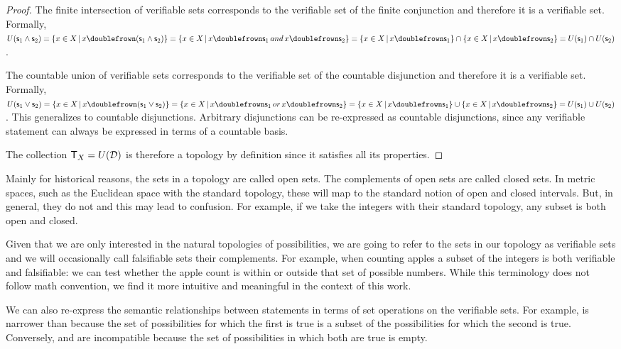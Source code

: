 \documentclass[11pt,letterpaper,fleqn]{memoir} %
\begin{document}
\begin{mathSection}
\begin{proof}
	The finite intersection of verifiable sets corresponds to the verifiable set of the finite conjunction and therefore it is a verifiable set. Formally, $U(\stmt_1\AND\stmt_2) = \{ x \in X \, | \, x \comp (\stmt_1\AND\stmt_2)\} =  \{ x \in X \, | \, x \comp \stmt_1 \, and \, x \comp \stmt_2\} = \{ x \in X \, | \, x \comp \stmt_1\} \cap \{ x \in X \, | \, x \comp \stmt_2\} = U(\stmt_1) \cap U(\stmt_2)$.

	The countable union of verifiable sets corresponds to the verifiable set of the countable disjunction and therefore it is a verifiable set. Formally, $U(\stmt_1\OR\stmt_2) = \{ x \in X \, | \, x \comp (\stmt_1\OR\stmt_2)\} =  \{ x \in X \, | \, x \comp \stmt_1 \, or \, x \comp \stmt_2\} = \{ x \in X \, | \, x \comp \stmt_1\} \cup \{ x \in X \, | \, x \comp \stmt_2\} = U(\stmt_1) \cup U(\stmt_2)$. This generalizes to countable disjunctions. Arbitrary disjunctions can be re-expressed as countable disjunctions, since any verifiable statement can always be expressed in terms of a countable basis.

	The collection $\mathsf{T}_X=U(\mathcal{D})$ is therefore a topology by definition since it satisfies all its properties.
\end{proof}
\end{mathSection}

Mainly for historical reasons, the sets in a topology are called open sets. The complements of open sets are called closed sets. In metric spaces, such as the Euclidean space with the standard topology, these will map to the standard notion of open and closed intervals. But, in general, they do not and this may lead to confusion. For example, if we take the integers with their standard topology, any subset is both open and closed.

Given that we are only interested in the natural topologies of possibilities, we are going to refer to the sets in our topology as verifiable sets and we will occasionally call falsifiable sets their complements. For example, when counting apples a subset of the integers is both verifiable and falsifiable: we can test whether the apple count is within or outside that set of possible numbers. While this terminology does not follow math convention, we find it more intuitive and meaningful in the context of this work.

We can also re-express the semantic relationships between statements in terms of set operations on the verifiable sets. For example,  is narrower than  because the set of possibilities for which the first is true is a subset of the possibilities for which the second is true. Conversely,  and  are incompatible because the set of possibilities in which both are true is empty.
\end{document}

